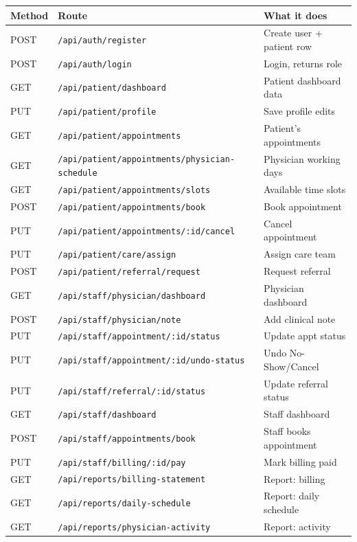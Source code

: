 \documentclass[12pt, letterpaper]{article}
\begin{document}
\begin{longtable}{lll}
  \toprule
  \textbf{Method} & \textbf{Route} & \textbf{What it does} \\
  \midrule
  \endhead
  POST & \texttt{/api/auth/register}                        & Create user + patient row \\
  POST & \texttt{/api/auth/login}                           & Login, returns role \\
  GET  & \texttt{/api/patient/dashboard}                    & Patient dashboard data \\
  PUT  & \texttt{/api/patient/profile}                      & Save profile edits \\
  GET  & \texttt{/api/patient/appointments}                 & Patient's appointments \\
  GET  & \texttt{/api/patient/appointments/physician-schedule} & Physician working days \\
  GET  & \texttt{/api/patient/appointments/slots}           & Available time slots \\
  POST & \texttt{/api/patient/appointments/book}            & Book appointment \\
  PUT  & \texttt{/api/patient/appointments/:id/cancel}      & Cancel appointment \\
  PUT  & \texttt{/api/patient/care/assign}                  & Assign care team \\
  POST & \texttt{/api/patient/referral/request}             & Request referral \\
  GET  & \texttt{/api/staff/physician/dashboard}            & Physician dashboard \\
  POST & \texttt{/api/staff/physician/note}                 & Add clinical note \\
  PUT  & \texttt{/api/staff/appointment/:id/status}         & Update appt status \\
  PUT  & \texttt{/api/staff/appointment/:id/undo-status}    & Undo No-Show/Cancel \\
  PUT  & \texttt{/api/staff/referral/:id/status}            & Update referral status \\
  GET  & \texttt{/api/staff/dashboard}                      & Staff dashboard \\
  POST & \texttt{/api/staff/appointments/book}              & Staff books appointment \\
  PUT  & \texttt{/api/staff/billing/:id/pay}                & Mark billing paid \\
  GET  & \texttt{/api/reports/billing-statement}            & Report: billing \\
  GET  & \texttt{/api/reports/daily-schedule}               & Report: daily schedule \\
  GET  & \texttt{/api/reports/physician-activity}           & Report: activity \\
  \bottomrule
\end{longtable}
\end{document}
